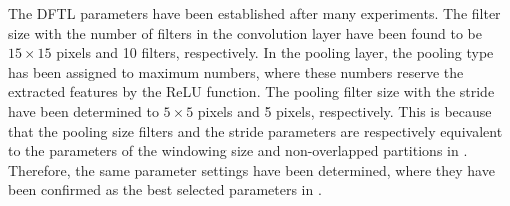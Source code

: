 \documentclass[conference]{IEEEtran}
\begin{document}
The DFTL parameters have been established after many experiments. The filter size with the number of filters in the convolution layer have been found to be $15 \times 15$ pixels and 10 filters, respectively. In the pooling layer, the pooling type has been assigned to maximum numbers, where these numbers reserve the extracted features by the ReLU function. The pooling filter size with the stride have been determined to $5 \times 5$ pixels and 5 pixels, respectively. This is because that the pooling size filters and the stride parameters are respectively equivalent to the parameters of the windowing size and non-overlapped partitions in \cite{Al-Nima2015Human} \cite{Al-Nima2017Robust} \cite{Al-Nima2017efficient} \cite{Al-Nima2017finger}. Therefore, the same parameter settings have been determined, where they have been confirmed as the best selected parameters in \cite{Al-Nima2017Signal}.
\end{document}
